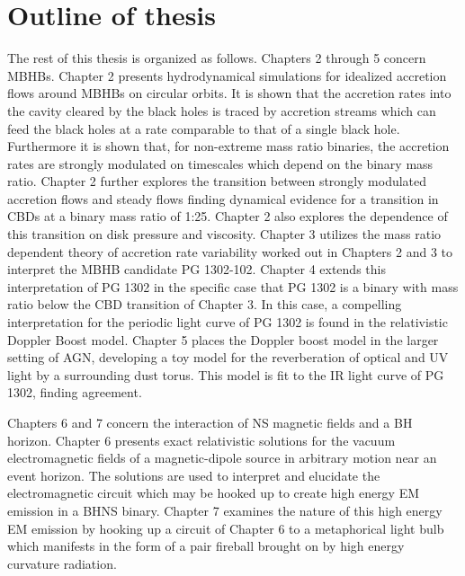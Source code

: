 \section{Outline of thesis}  
The rest of this thesis is organized as follows.
Chapters 2 through 5 concern MBHBs. Chapter 2 presents hydrodynamical
simulations for idealized accretion flows around MBHBs on circular orbits. It
is shown that the accretion rates into the cavity cleared by the black holes
is traced by accretion streams which can feed the black holes at a rate
comparable to that of a single black hole. Furthermore it is shown that, for
non-extreme mass ratio binaries, the accretion rates are strongly modulated on
timescales which depend on the binary mass ratio. Chapter 2 further explores
the transition between strongly modulated accretion flows and steady flows
finding dynamical evidence for a transition in CBDs at a binary mass ratio of
1:25. Chapter 2 also explores the dependence of this transition on disk
pressure and viscosity. Chapter 3 utilizes the mass ratio dependent theory of
accretion rate variability worked out in Chapters 2 and 3 to interpret the
MBHB candidate PG 1302-102. Chapter 4 extends this interpretation of PG 1302
in the specific case that PG 1302 is a binary with mass ratio below the CBD
transition of Chapter 3. In this case, a compelling interpretation for the
periodic light curve of PG 1302 is found in the relativistic Doppler Boost
model. Chapter 5 places the Doppler boost model in the larger setting of AGN,
developing a toy model for the reverberation of optical and UV light by a
surrounding dust torus. This model is fit to the IR light curve of PG 1302,
finding agreement.

Chapters 6 and 7 concern the interaction of NS magnetic fields and a BH
horizon. Chapter 6 presents exact relativistic solutions for the vacuum
electromagnetic fields of a magnetic-dipole source in arbitrary motion near an
event horizon. The solutions are used to interpret and elucidate the
electromagnetic circuit which may be hooked up to create high energy EM
emission in a BHNS binary. Chapter 7 examines the nature of this high energy EM emission by hooking up a circuit of Chapter 6 to a metaphorical light
bulb which manifests in the form of a pair fireball brought on by high energy
curvature radiation.



















